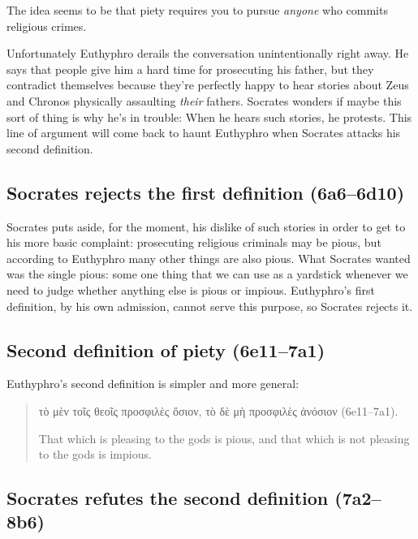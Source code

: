 \documentclass[12pt]{article}
\begin{document}
The idea seems to be that piety requires you to pursue \emph{anyone} who
commits religious crimes.

Unfortunately Euthyphro derails the conversation unintentionally right away.
He says that people give him a hard time for prosecuting his father, but they
contradict themselves because they're perfectly happy to hear stories about
Zeus and Chronos physically assaulting \emph{their} fathers.  Socrates wonders
if maybe this sort of thing is why he's in trouble: When he hears such stories,
he protests.  This line of argument will come back to haunt Euthyphro when
Socrates attacks his second definition.


\subsection{Socrates rejects the first definition (6a6--6d10)}

Socrates puts aside, for the moment, his dislike of such stories in order to
get to his more basic complaint: prosecuting religious criminals may be pious,
but according to Euthyphro many other things are also pious.  What Socrates
wanted was the single pious: some one thing that we can use as a yardstick
whenever we need to judge whether anything else is pious or impious.
Euthyphro's first definition, by his own admission, cannot serve this purpose,
so Socrates rejects it.


\subsection{Second definition of piety (6e11--7a1)}

Euthyphro's second definition is simpler and more general:

\begin{quote}

    {\g τὸ μὲν τοῖς θεοῖς προσφιλὲς ὅσιον, τὸ δὲ μὴ προσφιλὲς ἀνόσιον}
    (6e11--7a1).

    That which is pleasing to the gods is pious, and that which is not pleasing
    to the gods is impious.

\end{quote}

\subsection{Socrates refutes the second definition (7a2--8b6)}
\end{document}
